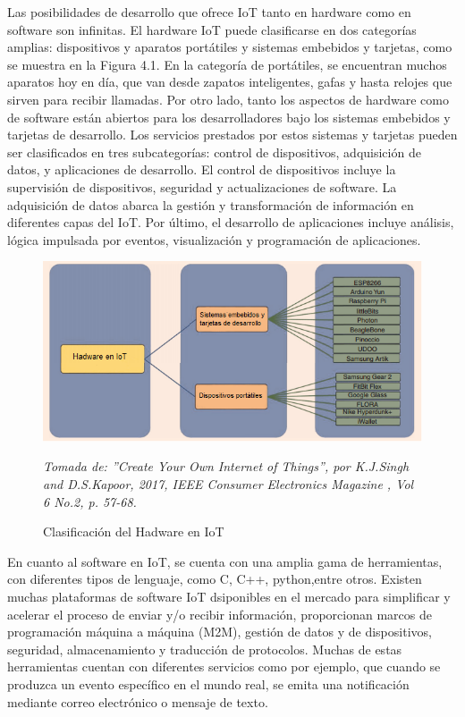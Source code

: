 Las posibilidades de desarrollo que ofrece IoT tanto en hardware como en software son infinitas. El hardware IoT puede clasificarse en dos categorías amplias: dispositivos y aparatos portátiles y
sistemas embebidos y tarjetas, como se muestra en la Figura 4.1.
En la categoría de portátiles, se encuentran muchos aparatos hoy en día, que van desde zapatos inteligentes, gafas y hasta relojes que sirven para recibir llamadas.
Por otro lado, tanto los aspectos de hardware como de software están abiertos para los desarrolladores bajo los sistemas embebidos y
tarjetas de desarrollo. Los servicios prestados por estos sistemas y
tarjetas pueden ser clasificados en tres subcategorías: control de dispositivos, adquisición de datos, y aplicaciones de desarrollo. El control de dispositivos incluye la supervisión de dispositivos, seguridad y actualizaciones de software. La adquisición de datos abarca la gestión y transformación de información en diferentes capas del IoT. Por último, el desarrollo de aplicaciones incluye análisis, lógica impulsada por eventos, visualización y programación de aplicaciones.\cite{7879392}

\begin{figure}[ht!]
\begin{centering}
\includegraphics [trim = 0mm 0mm 0mm 0mm, clip,angle=0,scale=0.6]{Images/hadware}%
\caption{\label{fig:Hadware}Clasificación del Hadware en IoT} \textit{Tomada de: ''Create Your Own Internet of Things'', por K.J.Singh and D.S.Kapoor, 2017, IEEE Consumer Electronics Magazine , Vol 6 No.2, p. 57-68.}
\par\end{centering}
\end{figure}

En cuanto al software en IoT, se cuenta con una amplia gama de herramientas, con diferentes tipos de lenguaje, como C, C++, python,entre otros. Existen muchas plataformas de software IoT dsiponibles en el mercado para simplificar y acelerar el proceso de enviar y/o recibir información, proporcionan marcos de programación máquina a máquina (M2M), gestión de datos y de dispositivos, seguridad, almacenamiento y traducción de protocolos. Muchas de estas herramientas cuentan con diferentes servicios como por ejemplo, que cuando se produzca un evento específico en el mundo real, se emita una notificación mediante correo electrónico o mensaje de texto. 

